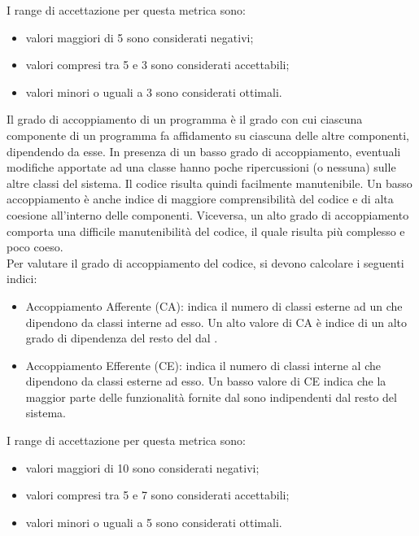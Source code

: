 			I range di accettazione per questa metrica sono:
			\begin{itemize}
				\item valori maggiori di 5 sono considerati negativi;
				\item valori compresi tra 5 e 3 sono considerati accettabili;
				\item valori minori o uguali a 3 sono considerati ottimali.
			\end{itemize}
		Il grado di accoppiamento di un programma è il grado con cui ciascuna componente di un programma fa affidamento su ciascuna delle altre componenti, dipendendo da esse. In presenza di un basso grado di accoppiamento, eventuali modifiche apportate ad una classe hanno poche ripercussioni (o nessuna) sulle altre classi del sistema. Il codice risulta quindi facilmente manutenibile. Un basso accoppiamento è anche indice di maggiore comprensibilità del codice e di alta coesione all'interno delle componenti. Viceversa, un alto grado di accoppiamento comporta una difficile manutenibilità del codice, il quale risulta più complesso e poco coeso.\\
		Per valutare il grado di accoppiamento del codice, si devono calcolare i seguenti indici:
		\begin{itemize}
			\item Accoppiamento Afferente (CA): indica il numero di classi esterne ad un  che dipendono da classi interne ad esso. Un alto valore di CA è indice di un alto grado di dipendenza del resto del  dal .
			\item Accoppiamento Efferente (CE): indica il numero di classi interne al  che dipendono da classi esterne ad esso. Un basso valore di CE indica che la maggior parte delle funzionalità fornite dal  sono indipendenti dal resto del sistema.
		\end{itemize}
		I range di accettazione per questa metrica sono:
		\begin{itemize}
			\item valori maggiori di 10 sono considerati negativi;
			\item valori compresi tra 5 e 7 sono considerati accettabili;
			\item valori minori o uguali a 5 sono considerati ottimali.
		\end{itemize}
			
